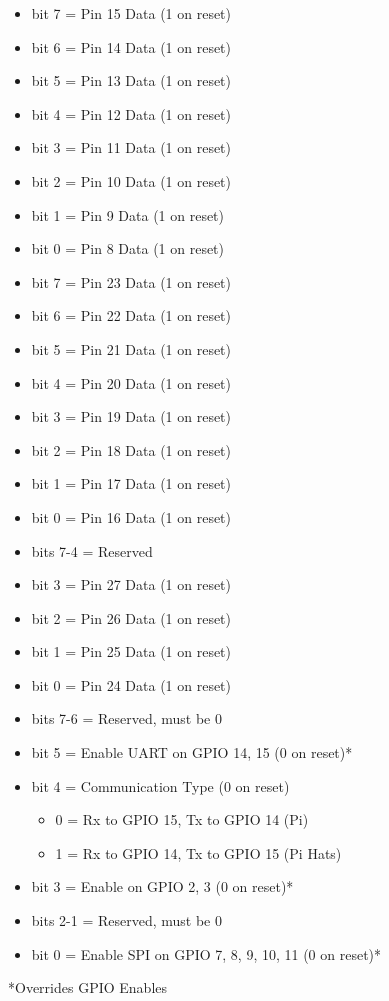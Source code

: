 \begin{itemize}
\item bit 7 = Pin 15 Data (1 on reset)
\item bit 6 = Pin 14 Data (1 on reset)
\item bit 5 = Pin 13 Data (1 on reset)
\item bit 4 = Pin 12 Data (1 on reset)
\item bit 3 = Pin 11 Data (1 on reset)
\item bit 2 = Pin 10 Data (1 on reset)
\item bit 1 = Pin 9 Data (1 on reset)
\item bit 0 = Pin 8 Data (1 on reset)
\end{itemize}

\begin{itemize}
\item bit 7 = Pin 23 Data (1 on reset)
\item bit 6 = Pin 22 Data (1 on reset)
\item bit 5 = Pin 21 Data (1 on reset)
\item bit 4 = Pin 20 Data (1 on reset)
\item bit 3 = Pin 19 Data (1 on reset)
\item bit 2 = Pin 18 Data (1 on reset)
\item bit 1 = Pin 17 Data (1 on reset)
\item bit 0 = Pin 16 Data (1 on reset)
\end{itemize}

\begin{itemize}
\item bits 7-4 = Reserved
\item bit 3 = Pin 27 Data (1 on reset)
\item bit 2 = Pin 26 Data (1 on reset)
\item bit 1 = Pin 25 Data (1 on reset)
\item bit 0 = Pin 24 Data (1 on reset)
\end{itemize}

\begin{itemize}
\item bits 7-6 = Reserved, must be 0
\item bit 5 = Enable UART on GPIO 14, 15 (0 on reset)*
\item bit 4 = Communication Type (0 on reset)
  \begin{itemize}
  \item 0 = Rx to GPIO 15, Tx to GPIO 14 (Pi)
  \item 1 = Rx to GPIO 14, Tx to GPIO 15 (Pi Hats)
  \end{itemize}
\item bit 3 = Enable \iic on GPIO 2, 3 (0 on reset)*
\item bits 2-1 = Reserved, must be 0
\item bit 0 = Enable SPI on GPIO 7, 8, 9, 10, 11 (0 on reset)*
\end{itemize}
*Overrides GPIO Enables

